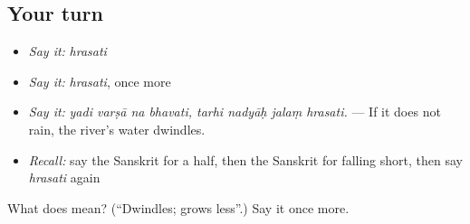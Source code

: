 \subsection*{Your turn}
\begin{itemize}
\raggedright
  \item \emph{Say it:} \emph{hrasati}
  \item \emph{Say it:} \emph{hrasati}, once more
  \item \emph{Say it:} \emph{yadi varṣā na bhavati, tarhi nadyāḥ jalaṃ hrasati.} — If it does not rain, the river's water dwindles.
  \item \emph{Recall:} say the Sanskrit for a half, then the Sanskrit for falling short, then say \emph{hrasati} again
\end{itemize}

\begin{tcolorbox}[breakable,colback=teal!4,colframe=teal!35!black,title={Before you move on}]
What does  mean? (\textquotedblleft{}Dwindles; grows less\textquotedblright{}.) Say it once more.
\end{tcolorbox}
